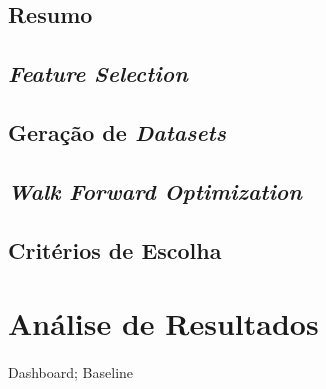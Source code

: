 \subsection{Resumo}
\paragraph{}

\subsection{\textit{Feature Selection}}
\paragraph{}

\subsection{Geração de \textit{Datasets}}
\paragraph{}

\subsection{\textit{Walk Forward Optimization}}
\paragraph{}

\subsection{Critérios de Escolha}
\paragraph{}


\section{Análise de Resultados}
\paragraph{} Dashboard; Baseline